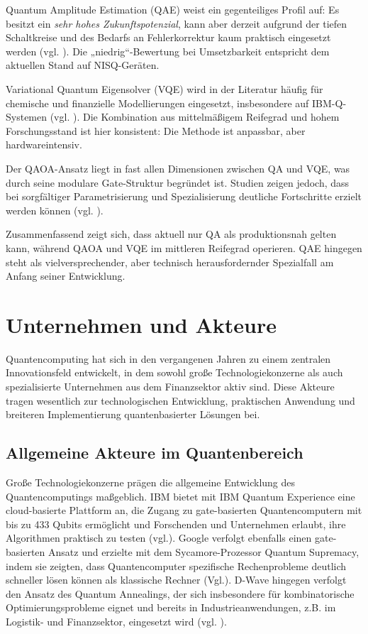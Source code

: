 Quantum Amplitude Estimation (QAE) weist ein gegenteiliges Profil auf: Es besitzt ein \emph{sehr hohes Zukunftspotenzial}, kann aber derzeit aufgrund der tiefen Schaltkreise und des Bedarfs an Fehlerkorrektur kaum praktisch eingesetzt werden (vgl. \cite{bouland_prospects_2020, martin2022}). Die „niedrig“-Bewertung bei Umsetzbarkeit entspricht dem aktuellen Stand auf NISQ-Geräten.

Variational Quantum Eigensolver (VQE) wird in der Literatur häufig für chemische und finanzielle Modellierungen eingesetzt, insbesondere auf IBM-Q-Systemen (vgl. \cite{buonaiuto_best_2023}). Die Kombination aus mittelmäßigem Reifegrad und hohem Forschungsstand ist hier konsistent: Die Methode ist anpassbar, aber hardwareintensiv.

Der QAOA-Ansatz liegt in fast allen Dimensionen zwischen QA und VQE, was durch seine modulare Gate-Struktur begründet ist. Studien zeigen jedoch, dass bei sorgfältiger Parametrisierung und Spezialisierung deutliche Fortschritte erzielt werden können (vgl. \cite{brandhofer_benchmarking_2022}).

Zusammenfassend zeigt sich, dass aktuell nur QA als produktionsnah gelten kann, während QAOA und VQE im mittleren Reifegrad operieren. QAE hingegen steht als vielversprechender, aber technisch herausfordernder Spezialfall am Anfang seiner Entwicklung.



\section{Unternehmen und Akteure}
Quantencomputing hat sich in den vergangenen Jahren zu einem zentralen Innovationsfeld entwickelt, in dem sowohl große Technologiekonzerne als auch spezialisierte Unternehmen aus dem Finanzsektor aktiv sind. Diese Akteure tragen wesentlich zur technologischen Entwicklung, praktischen Anwendung und breiteren Implementierung quantenbasierter Lösungen bei.

\subsection{Allgemeine Akteure im Quantenbereich}

Große Technologiekonzerne prägen die allgemeine Entwicklung des Quantencomputings maßgeblich. IBM bietet mit IBM Quantum Experience eine cloud-basierte Plattform an, die Zugang zu gate-basierten Quantencomputern mit bis zu 433 Qubits ermöglicht und Forschenden und Unternehmen erlaubt, ihre Algorithmen praktisch zu testen (vgl.\cite{IBM, 2023}). Google verfolgt ebenfalls einen gate-basierten Ansatz und erzielte mit dem Sycamore-Prozessor Quantum Supremacy, indem sie zeigten, dass Quantencomputer spezifische Rechenprobleme deutlich schneller lösen können als klassische Rechner (Vgl.\cite{arute_quantum_2019}). D-Wave hingegen verfolgt den Ansatz des Quantum Annealings, der sich insbesondere für kombinatorische Optimierungsprobleme eignet und bereits in Industrieanwendungen, z.B. im Logistik- und Finanzsektor, eingesetzt wird (vgl. \cite{Johson et al. 2011}).

